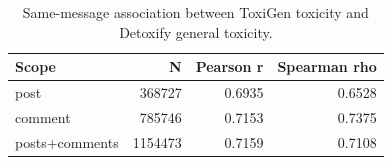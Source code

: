 \begin{table}[htbp]
\centering
\small
\caption{Same-message association between ToxiGen toxicity and Detoxify general toxicity.}
\label{tab:calibration}
\begin{tabular}{lrrr}
\toprule
Scope & N & Pearson r & Spearman rho \\
\midrule
post & 368727 & 0.6935 & 0.6528 \\
comment & 785746 & 0.7153 & 0.7375 \\
posts+comments & 1154473 & 0.7159 & 0.7108 \\
\bottomrule
\end{tabular}
\end{table}
